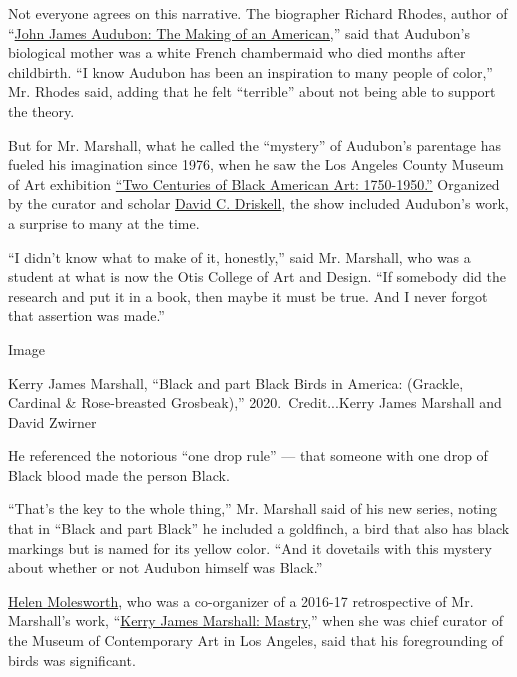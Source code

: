 Not everyone agrees on this narrative. The biographer Richard Rhodes,
author of
``\href{https://www.nytimes3xbfgragh.onion/2004/10/31/books/review/john-james-audubon-the-birdman-of-america.html}{John
James Audubon: The Making of an American,}'' said that Audubon's
biological mother was a white French chambermaid who died months after
childbirth. ``I know Audubon has been an inspiration to many people of
color,'' Mr. Rhodes said, adding that he felt ``terrible'' about not
being able to support the theory.

But for Mr. Marshall, what he called the ``mystery'' of Audubon's
parentage has fueled his imagination since 1976, when he saw the Los
Angeles County Museum of Art exhibition
\href{https://www.lacma.org/art/exhibition/two-centuries-black-american-art}{``Two
Centuries of Black American Art: 1750-1950.''} Organized by the curator
and scholar
\href{https://driskellcenterarchives.wordpress.com/tag/two-centuries-of-black-american-art-1750-1950/}{David
C. Driskell}, the show included Audubon's work, a surprise to many at
the time.

``I didn't know what to make of it, honestly,'' said Mr. Marshall, who
was a student at what is now the Otis College of Art and Design. ``If
somebody did the research and put it in a book, then maybe it must be
true. And I never forgot that assertion was made.''

Image

Kerry James Marshall, ``Black and part Black Birds in America: (Grackle,
Cardinal \& Rose-breasted Grosbeak),'' 2020.~Credit...Kerry James
Marshall and David Zwirner

He referenced the notorious ``one drop rule'' --- that someone with one
drop of Black blood made the person Black.

``That's the key to the whole thing,'' Mr. Marshall said of his new
series, noting that in ``Black and part Black'' he included a goldfinch,
a bird that also has black markings but is named for its yellow color.
``And it dovetails with this mystery about whether or not Audubon
himself was Black.''

\href{https://www.moca.org/exhibition/kerry-james-marshall-mastry}{Helen
Molesworth}, who was a co-organizer of a 2016-17 retrospective of Mr.
Marshall's work,
``\href{https://www.nytimes3xbfgragh.onion/2016/10/21/arts/design/kerry-james-marshalls-paintings-show-what-it-means-to-be-black-in-america.html}{Kerry
James Marshall: Mastry},'' when she was chief curator of the Museum of
Contemporary Art in Los Angeles, said that his foregrounding of birds
was significant.

